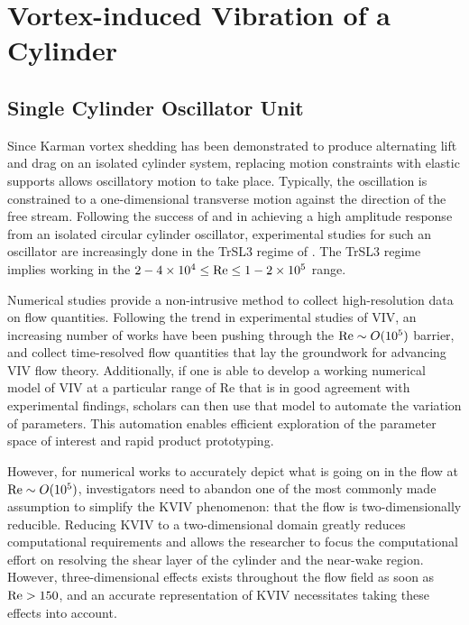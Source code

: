 \documentclass[oneside]{utmthesis}
\begin{document}
\section{Vortex-induced Vibration of a Cylinder} \label{sec:cylinderVIV}
\subsection{Single Cylinder Oscillator Unit} \label{ssec:singleCylinderOscillator}
Since Karman vortex shedding has been demonstrated to produce alternating lift and drag on an isolated cylinder system, replacing motion constraints with elastic supports allows oscillatory motion to take place. Typically, the oscillation is constrained to a one-dimensional transverse motion against the direction of the free stream. Following the success of \citet{Raghavan2007} and  \citet{Bernitsas2008a,Bernitsas2008b} in achieving a high amplitude response from an isolated circular cylinder oscillator, experimental studies for such an oscillator are increasingly done in the TrSL3 regime of \citet{Zdravkovich1997}. The TrSL3 regime implies working in the $2 - 4 \times 10^{4} \leq \text{Re} \leq 1 - 2 \times 10^{5}$ range.

Numerical studies provide a non-intrusive method to collect high-resolution data on flow quantities. Following the trend in experimental studies of VIV, an increasing number of works have been pushing through the $\text{Re} \sim O(10^{5})$ barrier, and collect time-resolved flow quantities that lay the groundwork for advancing VIV flow theory. Additionally, if one is able to develop a working numerical model of VIV at a particular range of Re that is in good agreement with experimental findings, scholars can then use that model to automate the variation of parameters. This automation enables efficient exploration of the parameter space of interest and rapid product prototyping.

However, for numerical works to accurately depict what is going on in the flow at $\text{Re} \sim O(10^{5})$, investigators need to abandon one of the most commonly made assumption to simplify the KVIV phenomenon: that the flow is two-dimensionally reducible. Reducing KVIV to a two-dimensional domain greatly reduces computational requirements and allows the researcher to focus the computational effort on resolving the shear layer of the cylinder and the near-wake region. However, three-dimensional effects exists throughout the flow field as soon as $\text{Re} > 150$, and an accurate representation of KVIV necessitates taking these effects into account.
\end{document}
